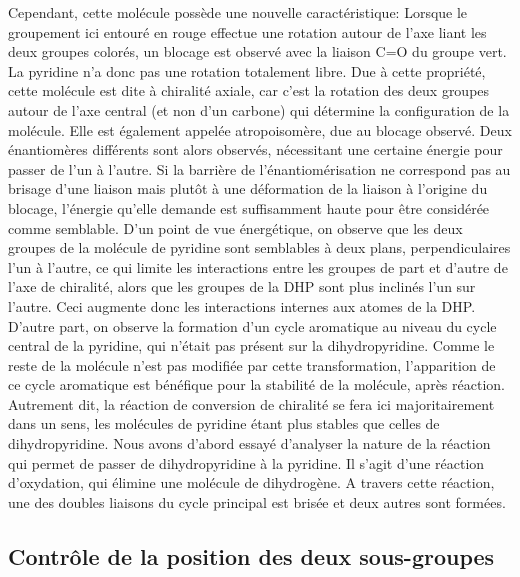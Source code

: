 \documentclass{article}
\begin{document}
Cependant, cette molécule possède une nouvelle caractéristique: Lorsque le groupement ici entouré en rouge effectue une rotation autour de l’axe liant les deux groupes colorés, un blocage est observé avec la liaison C=O du groupe vert. La pyridine n’a donc pas une rotation totalement libre. Due à cette propriété, cette molécule est dite à chiralité axiale, car c’est la rotation des deux groupes autour de l’axe central (et non d’un carbone) qui détermine la configuration de la molécule. Elle est également appelée atropoisomère, due au blocage observé. Deux énantiomères différents sont alors observés, nécessitant une certaine énergie pour passer de l’un à l’autre. Si la barrière de l’énantiomérisation ne correspond pas au brisage d’une liaison mais plutôt à une déformation de la liaison à l’origine du blocage, l'énergie qu’elle demande est suffisamment haute pour être considérée comme semblable.
\medbreak
\medbreak
D’un point de vue énergétique, on observe que les deux groupes de la molécule de pyridine sont semblables à deux plans, perpendiculaires l'un à l'autre, ce qui limite les interactions entre les groupes de part et d'autre de l'axe de chiralité, alors que les groupes de la DHP sont plus inclinés l’un sur l’autre. Ceci augmente donc les interactions internes aux atomes de la DHP.
D’autre part, on observe la formation d’un cycle aromatique au niveau du cycle central de la pyridine, qui n’était pas présent sur la dihydropyridine. Comme le reste de la molécule n’est pas modifiée par cette transformation, l’apparition de ce cycle aromatique est bénéfique pour la stabilité de la molécule, après réaction. Autrement dit, la réaction de conversion de chiralité se fera ici majoritairement dans un sens, les molécules de pyridine étant plus stables que celles de dihydropyridine.
\medbreak
Nous avons d'abord essayé d'analyser la nature de la réaction qui permet de passer de dihydropyridine à la pyridine. Il s'agit d'une réaction d'oxydation, qui élimine une molécule de dihydrogène. A travers cette réaction, une des doubles liaisons du cycle principal est brisée et deux autres sont formées.
\medbreak
\subsection{Contrôle de la position des deux sous-groupes}
\end{document}
